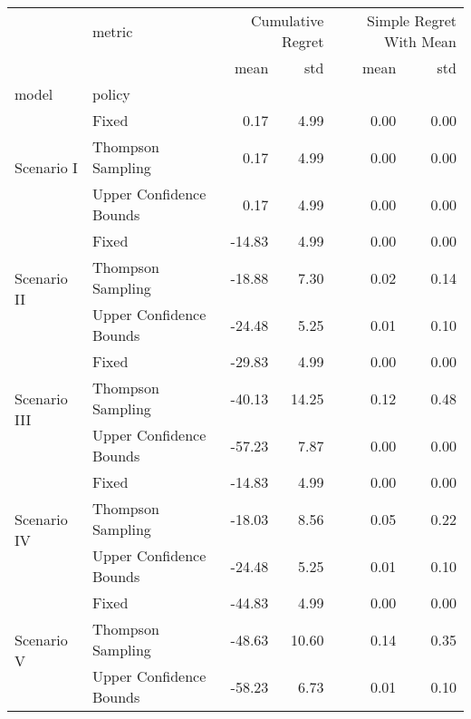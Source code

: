 \begin{tabular}{llrrrr}
 & metric & \multicolumn{2}{r}{Cumulative Regret} & \multicolumn{2}{r}{Simple Regret With Mean} \\
 &  & mean & std & mean & std \\
model & policy &  &  &  &  \\
\multirow[c]{3}{*}{Scenario I} & Fixed & 0.17 & 4.99 & 0.00 & 0.00 \\
 & Thompson Sampling & 0.17 & 4.99 & 0.00 & 0.00 \\
 & Upper Confidence Bounds & 0.17 & 4.99 & 0.00 & 0.00 \\
\multirow[c]{3}{*}{Scenario II} & Fixed & -14.83 & 4.99 & 0.00 & 0.00 \\
 & Thompson Sampling & -18.88 & 7.30 & 0.02 & 0.14 \\
 & Upper Confidence Bounds & -24.48 & 5.25 & 0.01 & 0.10 \\
\multirow[c]{3}{*}{Scenario III} & Fixed & -29.83 & 4.99 & 0.00 & 0.00 \\
 & Thompson Sampling & -40.13 & 14.25 & 0.12 & 0.48 \\
 & Upper Confidence Bounds & -57.23 & 7.87 & 0.00 & 0.00 \\
\multirow[c]{3}{*}{Scenario IV} & Fixed & -14.83 & 4.99 & 0.00 & 0.00 \\
 & Thompson Sampling & -18.03 & 8.56 & 0.05 & 0.22 \\
 & Upper Confidence Bounds & -24.48 & 5.25 & 0.01 & 0.10 \\
\multirow[c]{3}{*}{Scenario V} & Fixed & -44.83 & 4.99 & 0.00 & 0.00 \\
 & Thompson Sampling & -48.63 & 10.60 & 0.14 & 0.35 \\
 & Upper Confidence Bounds & -58.23 & 6.73 & 0.01 & 0.10 \\
\end{tabular}
